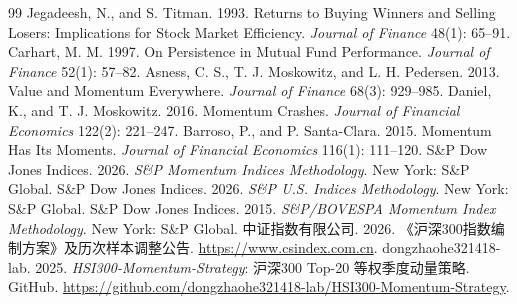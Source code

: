 \documentclass[11pt,a4paper]{article}
\begin{document}
\begin{thebibliography}{99}\footnotesize
{} Jegadeesh, N., and S. Titman. 1993. Returns to Buying Winners and Selling Losers: Implications for Stock Market Efficiency. \emph{Journal of Finance} 48(1): 65--91.
 Carhart, M. M. 1997. On Persistence in Mutual Fund Performance. \emph{Journal of Finance} 52(1): 57--82.
 Asness, C. S., T. J. Moskowitz, and L. H. Pedersen. 2013. Value and Momentum Everywhere. \emph{Journal of Finance} 68(3): 929--985.
 Daniel, K., and T. J. Moskowitz. 2016. Momentum Crashes. \emph{Journal of Financial Economics} 122(2): 221--247.
 Barroso, P., and P. Santa-Clara. 2015. Momentum Has Its Moments. \emph{Journal of Financial Economics} 116(1): 111--120.
 S\&P Dow Jones Indices. 2026. \emph{S\&P Momentum Indices Methodology}. New York: S\&P Global.
 S\&P Dow Jones Indices. 2026. \emph{S\&P U.S. Indices Methodology}. New York: S\&P Global.
 S\&P Dow Jones Indices. 2015. \emph{S\&P/BOVESPA Momentum Index Methodology}. New York: S\&P Global.
 中证指数有限公司. 2026. 《沪深300指数编制方案》及历次样本调整公告. \url{https://www.csindex.com.cn}.
 dongzhaohe321418-lab. 2025. \emph{HSI300-Momentum-Strategy}: 沪深300 Top-20 等权季度动量策略. GitHub. \url{https://github.com/dongzhaohe321418-lab/HSI300-Momentum-Strategy}.
\end{thebibliography}
\appendix
\end{document}
